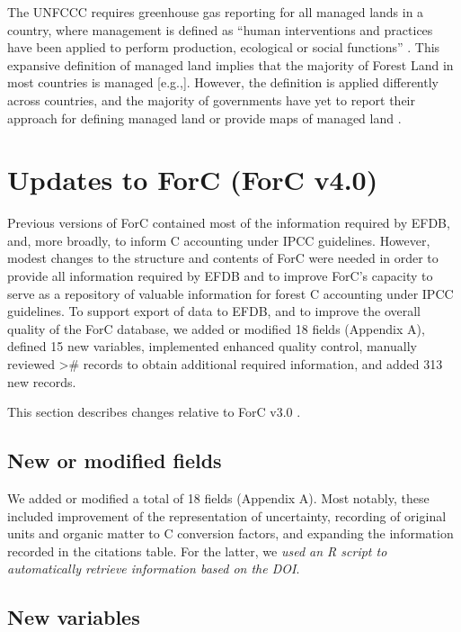 \documentclass[, manuscript]{copernicus}
\begin{document}
The UNFCCC requires greenhouse gas reporting for all managed lands in a
country, where management is defined as ``human interventions and
practices have been applied to perform production, ecological or social
functions'' \citep{ipcc_2006_2006}. This expansive definition of managed
land implies that the majority of Forest Land in most countries is
managed {[}e.g.,{]}. However, the definition is applied differently
across countries, and the majority of governments have yet to report
their approach for defining managed land or provide maps of managed land
\citep{ogle_delineating_2018, deng_comparing_2021}.

\section{Updates to ForC (ForC v4.0)}

Previous versions of ForC
\citep{anderson-teixeira_carbon_2016, anderson-teixeira_forc_2018, anderson-teixeira_carbon_2021}
contained most of the information required by EFDB, and, more broadly,
to inform C accounting under IPCC guidelines. However, modest changes to
the structure and contents of ForC were needed in order to provide all
information required by EFDB and to improve ForC's capacity to serve as
a repository of valuable information for forest C accounting under IPCC
guidelines. To support export of data to EFDB, and to improve the
overall quality of the ForC database, we added or modified 18 fields
(Appendix A), defined 15 new variables, implemented enhanced quality
control, manually reviewed \textgreater\# records to obtain additional
required information, and added 313 new records.

This section describes changes relative to ForC v3.0
\citep{anderson-teixeira_carbon_2021}.

\subsection{New or modified fields}

We added or modified a total of 18 fields (Appendix A). Most notably,
these included improvement of the representation of uncertainty,
recording of original units and organic matter to C conversion factors,
and expanding the information recorded in the citations table. For the
latter, we \emph{used an R script to automatically retrieve information
based on the DOI}.

\subsection{New variables}
\end{document}
